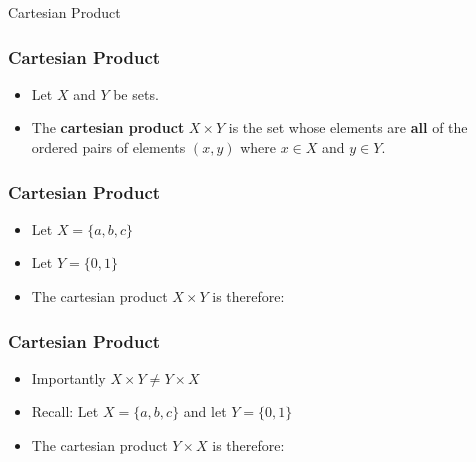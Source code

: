 \documentclass{beamer}
\begin{document}
\begin{frame}
\begin{center}
{ \Huge
Cartesian Product }
\\
\bigskip
{ \Large
}
\end{center}
\end{frame}

\begin{frame}
\frametitle{Cartesian Product}
{\LARGE
\begin{itemize}
\item Let $X$ and $Y$ be sets.
\item The \textbf{cartesian product} $X \times Y$ is the set whose elements are \textbf{all} of the ordered pairs of elements $(x,y)$ where $x \in X$ and $y \in Y$.
\end{itemize}
}


\end{frame}


\begin{frame}
\vspace{-1.9cm}
\frametitle{Cartesian Product}
{\LARGE
\begin{itemize}
\item Let $X = \{a,b,c\}$
\item Let $Y = \{0,1\}$ 
\item The cartesian product $X \times Y$ is therefore:
\end{itemize}
}
\end{frame}

\begin{frame}
\vspace{-1.9cm}
\frametitle{Cartesian Product}
{\LARGE
\begin{itemize}
\item Importantly $X \times Y \neq Y \times X$
\item Recall: Let $X = \{a,b,c\}$ and let $Y = \{0,1\}$ 
\item The cartesian product $Y \times X$ is therefore:
\end{itemize}
}



\end{frame}
\end{document}
